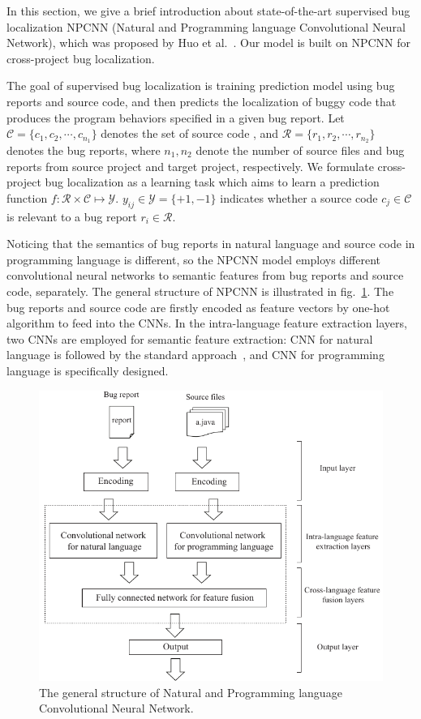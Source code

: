 In this section, we give a brief introduction about state-of-the-art supervised bug localization NPCNN (Natural and Programming language Convolutional Neural Network), which was proposed by Huo et al.~\cite{huo2016learning}. Our model is built on NPCNN for cross-project bug localization.

The goal of supervised bug localization is training prediction model using bug reports and source code,  and then predicts the localization of buggy code that produces the program behaviors specified in a given bug report. Let $\mathcal{C} =\{ c_1, c_2, \cdots, c_{n_1} \}$ denotes the set of source code , and $\mathcal{R} =\{ r_1, r_2, \cdots, r_{n_2}\} $ denotes the bug reports, where $n_1, n_2$ denote the number of source files and bug reports from source project and target project, respectively. We formulate cross-project bug localization as a learning task which aims to learn a prediction function $f: \mathcal{R} \times \mathcal{C} \mapsto \mathcal{Y}$. $y_{ij} \in \mathcal{Y} = \{+1, -1 \}$ indicates whether a source code $c_j \in \mathcal{C} $ is relevant to a bug report $r_i \in \mathcal{R}$.

Noticing that the semantics of bug reports in natural language and source code in programming language is different, so the NPCNN model employs different convolutional neural networks to semantic features from bug reports and source code, separately. The general structure of NPCNN is illustrated in fig.~\ref{fig:npcnn-structure}. The bug reports and source code are firstly encoded as feature vectors by one-hot algorithm to feed into the CNNs. In the intra-language feature extraction layers, two CNNs are employed for semantic feature extraction: CNN for natural language is followed by the standard approach~\cite{kim2014convolutional}, and CNN for programming language is specifically designed. 

\begin{figure}[hbt]
\centering
\includegraphics[width = \columnwidth]{pic/NPCNN-structure.pdf}
\caption{The general structure of Natural and Programming language Convolutional Neural Network.}
\label{fig:npcnn-structure}
\end{figure}

